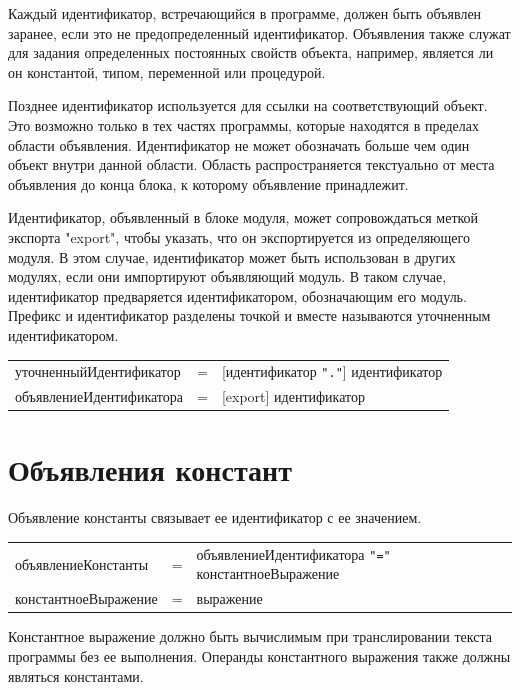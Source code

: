 \documentclass[a4paper,12pt]{article}
\newcommand{\lit}[1]{\texttt{"#1"}}
\begin{document}
    Каждый идентификатор, встречающийся в программе, должен быть объявлен заранее, если это не предопределенный идентификатор. Объявления также служат для задания определенных постоянных свойств объекта, например, является ли он константой, типом, переменной или процедурой.

    Позднее идентификатор используется для ссылки на соответствующий объект. Это возможно только в тех частях программы, которые находятся в пределах области объявления. Идентификатор не может обозначать больше чем один объект внутри данной области. Область распространяется текстуально от места объявления до конца блока, к которому объявление принадлежит.

    Идентификатор, объявленный в блоке модуля, может сопровождаться меткой экспорта "export", чтобы указать, что он экспортируется из определяющего модуля. В этом случае, идентификатор может быть использован в других модулях, если они импортируют объявляющий модуль. В таком случае, идентификатор предваряется идентификатором, обозначающим его модуль. Префикс и идентификатор разделены точкой и вместе называются уточненным идентификатором.

    \vspace{0.5cm}
    \begin{tabular}{l c l}
        уточненныйИдентификатор & = & [идентификатор \lit{.}] идентификатор \\
        объявлениеИдентификатора & = & [export] идентификатор
    \end{tabular}
    \vspace{0.5cm}



    \section{Объявления констант}

    Объявление константы связывает ее идентификатор с ее значением.

    \vspace{0.5cm}
    \begin{tabular}{l c l}
        объявлениеКонстанты & = & объявлениеИдентификатора \lit{=} константноеВыражение \\
        константноеВыражение & = & выражение
    \end{tabular}
    \vspace{0.5cm}

    Константное выражение должно быть вычислимым при транслировании текста программы без ее выполнения. Операнды константного выражения также должны являться константами.
\end{document}
